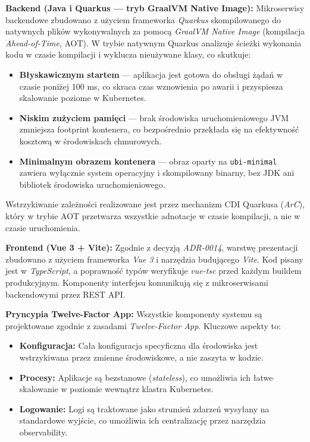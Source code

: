 \textbf{Backend (Java i Quarkus — tryb GraalVM Native Image):}
Mikroserwisy backendowe zbudowano z użyciem frameworka \textit{Quarkus} skompilowanego do natywnych plików wykonywalnych za pomocą \textit{GraalVM Native Image} (kompilacja \textit{Ahead-of-Time}, AOT). W trybie natywnym Quarkus analizuje ścieżki wykonania kodu w czasie kompilacji i wyklucza nieużywane klasy, co skutkuje:
\begin{itemize}
    \item \textbf{Błyskawicznym startem} — aplikacja jest gotowa do obsługi żądań w czasie poniżej 100 ms, co skraca czas wznowienia po awarii i przyspiesza skalowanie poziome w Kubernetes.
    \item \textbf{Niskim zużyciem pamięci} — brak środowiska uruchomieniowego JVM zmniejsza footprint kontenera, co bezpośrednio przekłada się na efektywność kosztową w środowiskach chmurowych.
    \item \textbf{Minimalnym obrazem kontenera} — obraz oparty na \texttt{ubi-minimal} zawiera wyłącznie system operacyjny i skompilowany binarny, bez JDK ani bibliotek środowiska uruchomieniowego.
\end{itemize}
Wstrzykiwanie zależności realizowane jest przez mechanizm CDI Quarkusa (\textit{ArC}), który w trybie AOT przetwarza wszystkie adnotacje w czasie kompilacji, a nie w czasie uruchomienia.

\textbf{Frontend (Vue 3 + Vite):}
Zgodnie z decyzją \textit{ADR-0014}, warstwę prezentacji zbudowano z użyciem frameworka \textit{Vue 3} i narzędzia budującego \textit{Vite}. Kod pisany jest w \textit{TypeScript}, a poprawność typów weryfikuje \textit{vue-tsc} przed każdym buildem produkcyjnym. Komponenty interfejsu komunikują się z mikroserwisami backendowymi przez REST API.

\textbf{Pryncypia Twelve-Factor App:}
Wszystkie komponenty systemu są projektowane zgodnie z zasadami \textit{Twelve-Factor App}. Kluczowe aspekty to:
\begin{itemize}
    \item \textbf{Konfiguracja:} Cała konfiguracja specyficzna dla środowiska jest wstrzykiwana przez zmienne środowiskowe, a nie zaszyta w kodzie.
    \item \textbf{Procesy:} Aplikacje są bezstanowe (\textit{stateless}), co umożliwia ich łatwe skalowanie w poziomie wewnątrz klastra Kubernetes.
    \item \textbf{Logowanie:} Logi są traktowane jako strumień zdarzeń wysyłany na standardowe wyjście, co umożliwia ich centralizację przez narzędzia observability.
\end{itemize}
